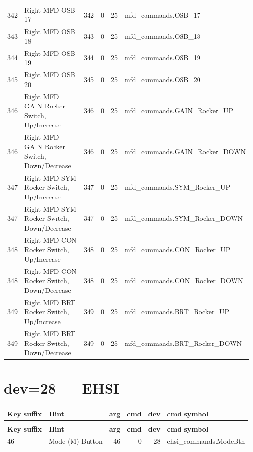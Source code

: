 \documentclass[10pt,a4paper]{article}
\begin{document}
\begin{longtable}{>{\ttfamily\small}p{38mm} >{\small}p{72mm} r r r >{\ttfamily\small}p{48mm}}
\rowcolor{rowodd}
  342 & Right MFD OSB 17 & 342 & 0 & 25 & mfd\_commands.OSB\_17 \\
  343 & Right MFD OSB 18 & 343 & 0 & 25 & mfd\_commands.OSB\_18 \\
\rowcolor{rowodd}
  344 & Right MFD OSB 19 & 344 & 0 & 25 & mfd\_commands.OSB\_19 \\
  345 & Right MFD OSB 20 & 345 & 0 & 25 & mfd\_commands.OSB\_20 \\
\rowcolor{rowodd}
  346 & Right MFD GAIN Rocker Switch, Up/Increase & 346 & 0 & 25 & mfd\_commands.GAIN\_Rocker\_UP \\
  346 & Right MFD GAIN Rocker Switch, Down/Decrease & 346 & 0 & 25 & mfd\_commands.GAIN\_Rocker\_DOWN \\
\rowcolor{rowodd}
  347 & Right MFD SYM Rocker Switch, Up/Increase & 347 & 0 & 25 & mfd\_commands.SYM\_Rocker\_UP \\
  347 & Right MFD SYM Rocker Switch, Down/Decrease & 347 & 0 & 25 & mfd\_commands.SYM\_Rocker\_DOWN \\
\rowcolor{rowodd}
  348 & Right MFD CON Rocker Switch, Up/Increase & 348 & 0 & 25 & mfd\_commands.CON\_Rocker\_UP \\
  348 & Right MFD CON Rocker Switch, Down/Decrease & 348 & 0 & 25 & mfd\_commands.CON\_Rocker\_DOWN \\
\rowcolor{rowodd}
  349 & Right MFD BRT Rocker Switch, Up/Increase & 349 & 0 & 25 & mfd\_commands.BRT\_Rocker\_UP \\
  349 & Right MFD BRT Rocker Switch, Down/Decrease & 349 & 0 & 25 & mfd\_commands.BRT\_Rocker\_DOWN \\
\end{longtable}
\section{dev=28 — EHSI}
\begin{longtable}{>{\ttfamily\small}p{38mm} >{\small}p{72mm} r r r >{\ttfamily\small}p{48mm}}
\toprule
\textbf{Key suffix} & \textbf{Hint} & \textbf{arg} & \textbf{cmd} & \textbf{dev} & \textbf{cmd symbol} \\
\midrule
\endfirsthead
\multicolumn{6}{l}{\small\itshape continued\ldots}\\
\toprule
\textbf{Key suffix} & \textbf{Hint} & \textbf{arg} & \textbf{cmd} & \textbf{dev} & \textbf{cmd symbol} \\
\midrule
\endhead
\bottomrule
\endfoot
\rowcolor{rowodd}
  46 & Mode (M) Button & 46 & 0 & 28 & ehsi\_commands.ModeBtn \\
\end{longtable}
\end{document}
